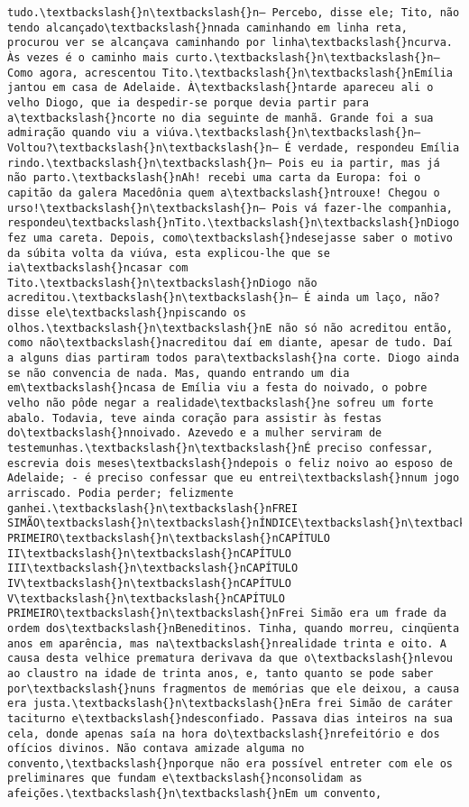 \begin{Verbatim}[commandchars=\\\{\}]
tudo.\textbackslash{}n\textbackslash{}n— Percebo, disse ele; Tito, não tendo alcançado\textbackslash{}nnada caminhando em linha reta, procurou ver se alcançava caminhando por linha\textbackslash{}ncurva. Às vezes é o caminho mais curto.\textbackslash{}n\textbackslash{}n— Como agora, acrescentou Tito.\textbackslash{}n\textbackslash{}nEmília jantou em casa de Adelaide. À\textbackslash{}ntarde apareceu ali o velho Diogo, que ia despedir-se porque devia partir para a\textbackslash{}ncorte no dia seguinte de manhã. Grande foi a sua admiração quando viu a viúva.\textbackslash{}n\textbackslash{}n— Voltou?\textbackslash{}n\textbackslash{}n— É verdade, respondeu Emília rindo.\textbackslash{}n\textbackslash{}n— Pois eu ia partir, mas já não parto.\textbackslash{}nAh! recebi uma carta da Europa: foi o capitão da galera Macedônia quem a\textbackslash{}ntrouxe! Chegou o urso!\textbackslash{}n\textbackslash{}n— Pois vá fazer-lhe companhia, respondeu\textbackslash{}nTito.\textbackslash{}n\textbackslash{}nDiogo fez uma careta. Depois, como\textbackslash{}ndesejasse saber o motivo da súbita volta da viúva, esta explicou-lhe que se ia\textbackslash{}ncasar com Tito.\textbackslash{}n\textbackslash{}nDiogo não acreditou.\textbackslash{}n\textbackslash{}n— É ainda um laço, não? disse ele\textbackslash{}npiscando os olhos.\textbackslash{}n\textbackslash{}nE não só não acreditou então, como não\textbackslash{}nacreditou daí em diante, apesar de tudo. Daí a alguns dias partiram todos para\textbackslash{}na corte. Diogo ainda se não convencia de nada. Mas, quando entrando um dia em\textbackslash{}ncasa de Emília viu a festa do noivado, o pobre velho não pôde negar a realidade\textbackslash{}ne sofreu um forte abalo. Todavia, teve ainda coração para assistir às festas do\textbackslash{}nnoivado. Azevedo e a mulher serviram de testemunhas.\textbackslash{}n\textbackslash{}nÉ preciso confessar, escrevia dois meses\textbackslash{}ndepois o feliz noivo ao esposo de Adelaide; - é preciso confessar que eu entrei\textbackslash{}nnum jogo arriscado. Podia perder; felizmente ganhei.\textbackslash{}n\textbackslash{}nFREI SIMÃO\textbackslash{}n\textbackslash{}nÍNDICE\textbackslash{}n\textbackslash{}nCAPÍTULO PRIMEIRO\textbackslash{}n\textbackslash{}nCAPÍTULO II\textbackslash{}n\textbackslash{}nCAPÍTULO III\textbackslash{}n\textbackslash{}nCAPÍTULO IV\textbackslash{}n\textbackslash{}nCAPÍTULO V\textbackslash{}n\textbackslash{}nCAPÍTULO PRIMEIRO\textbackslash{}n\textbackslash{}nFrei Simão era um frade da ordem dos\textbackslash{}nBeneditinos. Tinha, quando morreu, cinqüenta anos em aparência, mas na\textbackslash{}nrealidade trinta e oito. A causa desta velhice prematura derivava da que o\textbackslash{}nlevou ao claustro na idade de trinta anos, e, tanto quanto se pode saber por\textbackslash{}nuns fragmentos de memórias que ele deixou, a causa era justa.\textbackslash{}n\textbackslash{}nEra frei Simão de caráter taciturno e\textbackslash{}ndesconfiado. Passava dias inteiros na sua cela, donde apenas saía na hora do\textbackslash{}nrefeitório e dos ofícios divinos. Não contava amizade alguma no convento,\textbackslash{}nporque não era possível entreter com ele os preliminares que fundam e\textbackslash{}nconsolidam as afeições.\textbackslash{}n\textbackslash{}nEm um convento, 
\end{Verbatim}
